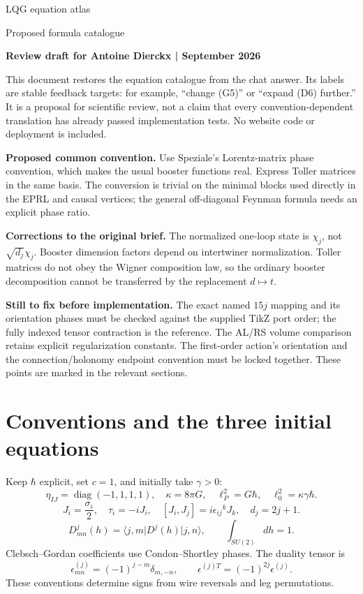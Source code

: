 \documentclass[11pt,a4paper]{article}
\newcommand{\ket}[1]{\lvert #1\rangle}
\newcommand{\bra}[1]{\langle #1\rvert}
\newcommand{\eq}[2]{\begin{equation}#2\tag{#1}\end{equation}}
\begin{document}
{\color{ink}\Huge LQG equation atlas}\par
{\Large Proposed formula catalogue}\par
\textbf{Review draft for Antoine Dierckx \quad |  September 2026}

This document restores the equation catalogue from the chat answer. Its labels are stable feedback targets: for example, ``change (G5)'' or ``expand (D6) further.'' It is a proposal for scientific review, not a claim that every convention-dependent translation has already passed implementation tests. No website code or deployment is included.

\textbf{Proposed common convention.} Use Speziale's Lorentz-matrix phase convention, which makes the usual booster functions real. Express Toller matrices in the same basis. The conversion is trivial on the minimal blocks used directly in the EPRL and causal vertices; the general off-diagonal Feynman formula needs an explicit phase ratio.

\textbf{Corrections to the original brief.} The normalized one-loop state is $\chi_j$, not $\sqrt{d_j}\chi_j$. Booster dimension factors depend on intertwiner normalization. Toller matrices do not obey the Wigner composition law, so the ordinary booster decomposition cannot be transferred by the replacement $d\mapsto t$.

\textbf{Still to fix before implementation.} The exact named $15j$ mapping and its orientation phases must be checked against the supplied TikZ port order; the fully indexed tensor contraction is the reference. The AL/RS volume comparison retains explicit regularization constants. The first-order action's orientation and the connection/holonomy endpoint convention must be locked together. These points are marked in the relevant sections.

\begingroup
\footnotesize
\setlength{\parskip}{0pt}
\tableofcontents
\endgroup
\newpage
\section{Conventions and the three initial equations}
Keep $\hbar$ explicit, set $c=1$, and initially take $\gamma>0$:
\eq{C1}{\eta_{IJ}=\operatorname{diag}(-1,1,1,1),\quad\kappa=8\pi G,\quad\ell_P^2=G\hbar,\quad\ell_0^2=\kappa\gamma\hbar.}
\eq{C2}{J_i=\frac{\sigma_i}{2},\quad\tau_i=-iJ_i,\quad[J_i,J_j]=i\epsilon_{ij}{}^kJ_k,\quad d_j=2j+1.}
\eq{C3}{D^j_{mn}(h)=\bra{j,m}D^j(h)\ket{j,n},\qquad\int_{SU(2)}dh=1.}
Clebsch--Gordan coefficients use Condon--Shortley phases. The duality tensor is
\eq{C4}{\epsilon^{(j)}_{mn}=(-1)^{j-m}\delta_{m,-n},\qquad\epsilon^{(j)T}=(-1)^{2j}\epsilon^{(j)}.}
These conventions determine signs from wire reversals and leg permutations.
\end{document}
